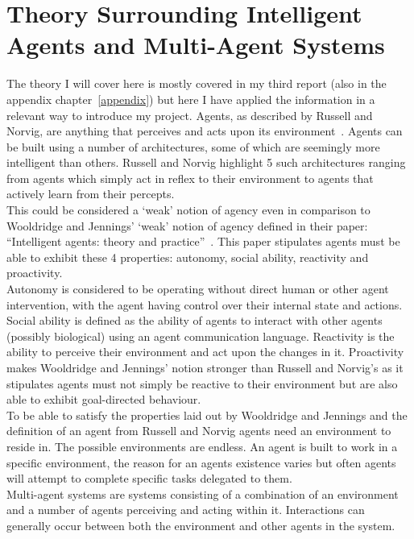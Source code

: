 \documentclass[]{final_report}
\begin{document}
\section{Theory Surrounding Intelligent Agents and Multi-Agent Systems}
The theory I will cover here is mostly covered in my third report (also in the appendix chapter~\ref{appendix}) but here I have applied the information in a relevant way to introduce my project. Agents, as described by Russell and Norvig, are anything that perceives and acts upon its environment~\cite{russell2016artificial}. Agents can be built using a number of architectures, some of which are seemingly more intelligent than others. Russell and Norvig highlight 5 such architectures ranging from agents which simply act in reflex to their environment to agents that actively learn from their percepts.\\
This could be considered a `weak' notion of agency even in comparison to Wooldridge and Jennings' `weak' notion of agency defined in their paper: ``Intelligent agents: theory and practice''~\cite{wooldridge_jennings_1995}. This paper stipulates agents must be able to exhibit these 4 properties: autonomy, social ability, reactivity and proactivity.\\
Autonomy is considered to be operating without direct human or other agent intervention, with the agent having control over their internal state and actions. Social ability is defined as the ability of agents to interact with other agents (possibly biological) using an agent communication language. Reactivity is the ability to perceive their environment and act upon the changes in it. Proactivity makes Wooldridge and Jennings' notion stronger than Russell and Norvig's as it stipulates agents must not simply be reactive to their environment but are also able to exhibit goal-directed behaviour.\\
To be able to satisfy the properties laid out by Wooldridge and Jennings and the definition of an agent from Russell and Norvig agents need an environment to reside in. The possible environments are endless. An agent is built to work in a specific environment, the reason for an agents existence varies but often agents will attempt to complete specific tasks delegated to them.\\
Multi-agent systems are systems consisting of a combination of an environment and a number of agents perceiving and acting within it. Interactions can generally occur between both the environment and other agents in the system.
\end{document}
